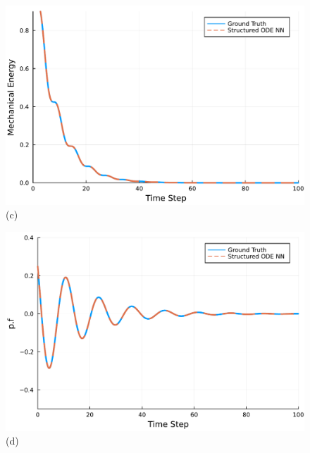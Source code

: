 \documentclass[
	parskip, 			   %
	twoside, 			   %
	DIV=14, 			   %
	BCOR=15.0mm, 		   %
	headsepline, 		   %
	open=right, 		   %
	captions=tableheading, %
	bibliography=totoc,    %
	numbers=noenddot       %
]{scrreprt}
\begin{document}
\begin{figure}[h!]
\begin{minipage}{.3\textwidth}
    \end{minipage}%
    \begin{minipage}{.3\textwidth}
    \centering
    \includegraphics[width=1\linewidth]{figures/Hamiltonian_evolution_compositional_ndho_with_EPHS_structure_reuse.pdf}
    \\(c)
    \end{minipage}
    \begin{minipage}{.3\textwidth}
    \centering
    \includegraphics[width=1\linewidth]{figures/p.f_compositional_ndho_with_EPHS_structure_reuse.pdf}
    \\(d)
    \end{minipage}%
    \begin{minipage}{.3\textwidth}
    \centering

\end{minipage}
\end{figure}
\end{document}
